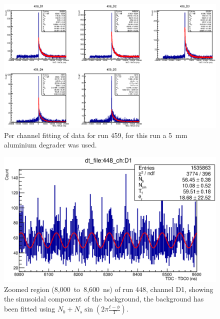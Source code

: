 %
\begin{figure}
    \centering
      \includegraphics[scale=1]{images/momentum_spectrum/459.eps}
    \caption{Per channel fitting of data for run 459, for this run a 5~mm aluminium degrader was used.}
    \label{fig:images_momentum_spectrum_459}
\end{figure}

\begin{figure}[hptb]
  \centering
    \includegraphics[width=.9\textwidth]{images/momentum_spectrum/448_D1_noise_fit.eps}
  \caption{Zoomed region (8,000~to~8,600~ns) of run 448, channel D1, showing the sinusoidal component of the background, the background has been fitted using \(N_b + N_s\sin(2\pi\frac{t-\phi}{T})\).}
  \label{fig:images_momentum_spectrum_448_D1_noise_fit}
\end{figure}

